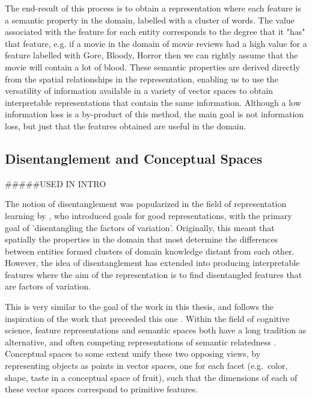 The end-result of this process is to obtain a representation where each feature is a semantic property in the domain, labelled with a cluster of words. The value associated with the feature for each entity corresponds to the degree that it "has" that feature, e.g. if a movie in the domain of movie reviews had a high value for  a feature labelled with {Gore, Bloody, Horror} then we can rightly assume that the movie will contain a lot of blood. These semantic properties are derived directly from the spatial relationships in the representation, enabling us to use the versatility of information available in a variety of vector spaces to obtain interpretable representations that contain the same information. Although a low information loss is a by-product of this method, the main goal is not information loss, but just that the features obtained are useful in the domain.




\subsection{Disentanglement and Conceptual Spaces} #####USED IN INTRO

The notion of disentanglement was popularized in the field of representation learning by  \cite{Bengio2013}, who introduced goals for good representations, with the primary goal of 'disentangling the factors of variation'. Originally, this meant that spatially the properties in the domain that most determine the differences between entities formed clusters  of domain knowledge distant from each other. However, the idea of disentanglement has extended into producing interpretable features \cite{Hu} where the aim of the representation is to find disentangled features that are factors of variation.



This is very similar to the goal of the work in this thesis, and follows the inspiration of the work that preceeded this one \cite{Derrac2015}. Within the field of cognitive science, feature representations and semantic spaces both have a long tradition as alternative, and often competing representations of semantic relatedness \cite{tversky1977features}. Conceptual spaces \cite{gardenfors2004conceptual} to some extent unify these two opposing views, by representing objects as points in vector spaces, one for each facet (e.g.\ color, shape, taste in a conceptual space of fruit), such that the dimensions of each of these vector spaces correspond to primitive features. %

